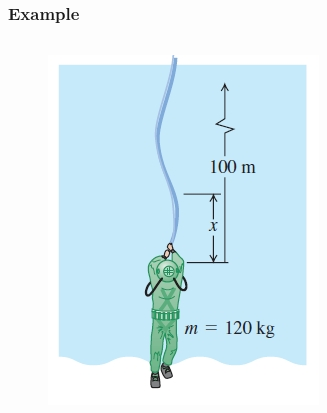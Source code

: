 \documentclass[]{beamer}
\begin{document}
  \begin{frame}
    \frametitle{Example \theexample} 
  
  
    \begin{columns}[c]
      \column{2in}  %
   
      \begin{figure}[h!]
        \begin{center}
          \includegraphics[height=2.in]{images4/15_84.jpg}
        \end{center}
      \end{figure}
      \column{2in}
   
   
 
  
      
      \end{columns}
  
  
  
  
    
  
  \end{frame}


    



 
\end{document}
